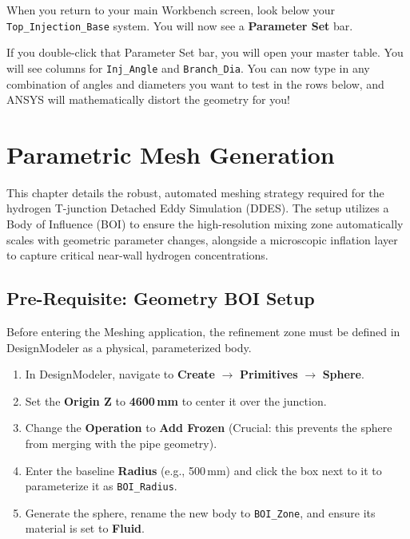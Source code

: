 \documentclass[12pt,a4paper]{report}
\begin{document}
When you return to your main Workbench screen, look below your \texttt{Top\_Injection\_Base} system. You will now see a \textbf{Parameter Set} bar.

If you double-click that Parameter Set bar, you will open your master table. You will see columns for \texttt{Inj\_Angle} and \texttt{Branch\_Dia}. You can now type in any combination of angles and diameters you want to test in the rows below, and ANSYS will mathematically distort the geometry for you!


\chapter{Parametric Mesh Generation}

This chapter details the robust, automated meshing strategy required for the hydrogen T-junction Detached Eddy Simulation (DDES). The setup utilizes a Body of Influence (BOI) to ensure the high-resolution mixing zone automatically scales with geometric parameter changes, alongside a microscopic inflation layer to capture critical near-wall hydrogen concentrations.


\section{Pre-Requisite: Geometry BOI Setup}

Before entering the Meshing application, the refinement zone must be defined in DesignModeler as a physical, parameterized body.

\begin{enumerate}
  \item In DesignModeler, navigate to \textbf{Create} $\rightarrow$ \textbf{Primitives} $\rightarrow$ \textbf{Sphere}.
  \item Set the \textbf{Origin Z} to \textbf{4600\,mm} to center it over the junction.
  \item Change the \textbf{Operation} to \textbf{Add Frozen} (Crucial: this prevents the sphere from merging with the pipe geometry).
  \item Enter the baseline \textbf{Radius} (e.g., 500\,mm) and click the box next to it to parameterize it as \texttt{BOI\_Radius}.
  \item Generate the sphere, rename the new body to \texttt{BOI\_Zone}, and ensure its material is set to \textbf{Fluid}.
\end{enumerate}
\end{document}
